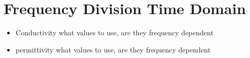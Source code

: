 \section{Frequency Division Time Domain}
\label{sec:fdtd}

\begin{itemize}
\item Conductivity what values to use, are they frequency dependent
\item permittivity what values to use, are they frequency dependent
\end{itemize}